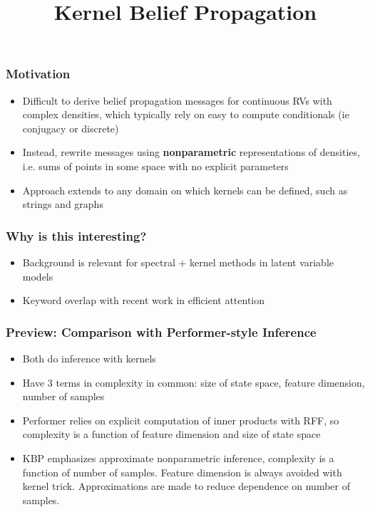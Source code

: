 \documentclass{beamer}
\title{Kernel Belief Propagation}
\begin{document}
 
\frame{\titlepage}
 
\begin{frame}
\frametitle{Motivation}
\begin{itemize}
\item Difficult to derive belief propagation messages for continuous RVs
    with complex densities, which typically rely on easy to compute conditionals
    (ie conjugacy or discrete)
\vspace{1em}
\item Instead, rewrite messages using \textbf{nonparametric} representations
of densities, i.e. sums of points in some space with no explicit parameters
\vspace{1em}
\item Approach extends to any domain on which kernels can be defined,
such as strings and graphs
\end{itemize}
\end{frame}

\begin{frame}
\frametitle{Why is this interesting?}
\begin{itemize}
\item Background is relevant for spectral + kernel methods in latent variable models 
\vspace{2em}
\item Keyword overlap with recent work in efficient attention
\end{itemize}
\end{frame}

\begin{frame}
\frametitle{Preview: Comparison with Performer-style Inference}
\begin{itemize}
\item Both do inference with kernels
\vspace{1em}
\item Have 3 terms in complexity in common: size of state space, feature dimension, number of samples
\vspace{1em}
\item Performer relies on explicit computation of inner products with RFF,
    so complexity is a function of feature dimension and size of state space
\vspace{1em}
\item KBP emphasizes approximate nonparametric inference, complexity is a
    function of number of samples.
    Feature dimension is always avoided with kernel trick.
    Approximations are made to reduce dependence on number of samples.
\end{itemize}
\end{frame}
\end{document}
